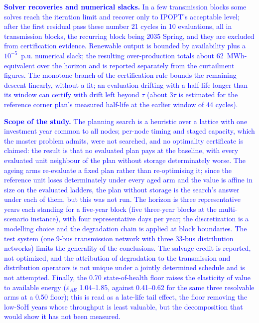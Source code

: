 \textcolor{blue}{
    \textbf{Solver recoveries and numerical slacks.} In a few transmission blocks some solves reach the iteration limit and recover only to IPOPT's acceptable level; after the first residual pass these number 21 cycles in 10 evaluations, all in transmission blocks, the recurring block being 2035 Spring, and they are excluded from certification evidence. Renewable output is bounded by availability plus a $10^{-5}$~p.u. numerical slack; the resulting over-production totals about 62~MWh-equivalent over the horizon and is reported separately from the curtailment figures. The monotone branch of the certification rule bounds the remaining descent linearly, without a fit; an evaluation drifting with a half-life longer than its window can certify with drift left beyond $\tau$ (about $3\tau$ is estimated for the reference corner plan's measured half-life at the earlier window of 44 cycles).
}

\textcolor{blue}{
    \textbf{Scope of the study.} The planning search is a heuristic over a lattice with one investment year common to all nodes; per-node timing and staged capacity, which the master problem admits, were not searched, and no optimality certificate is claimed: the result is that no evaluated plan pays at the baseline, with every evaluated unit neighbour of the plan without storage determinately worse. The ageing arms re-evaluate a fixed plan rather than re-optimising it; since the reference unit loses determinately under every aged arm and the value is affine in size on the evaluated ladders, the plan without storage is the search's answer under each of them, but this was not run. The horizon is three representative years each standing for a five-year block (five three-year blocks at the multi-scenario instance), with four representative days per year; the discretization is a modelling choice and the degradation chain is applied at block boundaries. The test system (one 9-bus transmission network with three 33-bus distribution networks) limits the generality of the conclusions. The salvage credit is reported, not optimized, and the attribution of degradation to the transmission and distribution operators is not unique under a jointly determined schedule and is not attempted. Finally, the 0.70 state-of-health floor raises the elasticity of value to available energy ($\varepsilon_{AE}$ 1.04--1.85, against 0.41--0.62 for the same three resolvable arms at a 0.50 floor); this is read as a late-life tail effect, the floor removing the low-SoH years whose throughput is least valuable, but the decomposition that would show it has not been measured.
}

